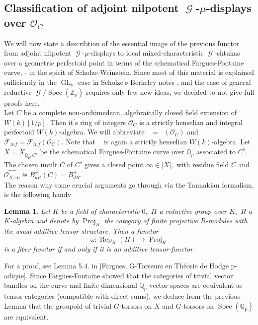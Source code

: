 \documentclass[a4paper,10,5 pt]{amsart}
\newtheorem{Lemma}[Satz]{Lemma}
\theoremstyle{definition}
\DeclareMathOperator{\Spec}{Spec}
\DeclareMathOperator{\GL}{GL}
\DeclareMathOperator{\Ainf}{\mathbb{A}_{inf}}
\DeclareMathOperator{\Rep}{Rep}
\DeclareMathOperator{\G}{\mathcal{G}}
\DeclareMathOperator{\Proj}{Proj}
\begin{document}
\subsection{Classification of adjoint nilpotent $\G$-$\mu$-displays over $\mathcal{O}_{C}$}
We will now state a describtion of the essential image of the previous functor from adjoint nilpotent $\G$-$\mu$-displays to local mixed-characteristic $\G$-shtukas over a geometric perfectoid point in terms of the schematical Fargues-Fontaine curve, \cite{the curve} - in the spirit of Scholze-Weinstein. Since most of this material is explained sufficiently in the $\GL_{n}$-case in Scholze$^{\prime}$s Berkeley notes \cite{Berkeley lectures}, and the case of general reductive $\G/\Spec(\mathbb{Z}_{p})$ requires only few new ideas, we decided to not give full proofs here.
\\
Let $C$ be a complete non-archimedean, algebraically closed field extension of $W(k)[1/p].$ Then it$^{\prime}$s ring of integers $\mathcal{O}_{C}$ is a strictly henselian and integral perfectoid $W(k)$-algebra. We will abbreviate $\Ainf=\Ainf(\mathcal{O}_{C})$ and $\mathcal{F}_{inf}=\mathcal{F}_{inf}(\mathcal{O}_{C}).$ Note that $\Ainf$ is again a strictly henselian $W(k)$-algebra. Let $X=X_{\mathbb{Q}_{p},C^{\flat}}$ be the schematical Fargues-Fontaine curve over $\mathbb{Q}_{p}$ associated to $C^{\flat}.$ The chosen untilt $C$ of $C^{\flat}$ gives a closed point $\infty\in |X|,$ with residue field $C$ and $\widehat{\mathcal{O}_{X,\infty}}\cong B^{+}_{dR}(C)=B^{+}_{dR}.$
\\
The reason why some crucial arguments go through via the Tannakian formalism, is the following handy 
\begin{Lemma}\label{Fargues Lemma fuer Tannaka Formalismus}
Let $K$ be a field of characteristic $0,$ $H$ a reductive group over $K,$ $R$ a $K$-algebra and denote by $\Proj_{R}$ the category of finite projective $R$-modules with the usual additive tensor structure. Then a functor
$$
\omega\colon \Rep_{K}(H)\rightarrow \Proj_{R}
$$
is a fiber functor if and only if it is an additive tensor-functor.
\end{Lemma}
For a proof, see Lemma 5.4. in [Fargues, G-Torseurs en Théorie de Hodge p-adique]. Since Fargues-Fontaine showed that the categories of trivial vector bundles on the curve and finite dimensional $\mathbb{Q}_{p}$-vector spaces are equivalent as tensor-categories (compatible with direct sums), we deduce from the previous Lemma that the groupoid of trivial $G$-torsors on $X$ and $G$-torsors on $\Spec(\mathbb{Q}_{p})$ are equivalent.
\end{document}
